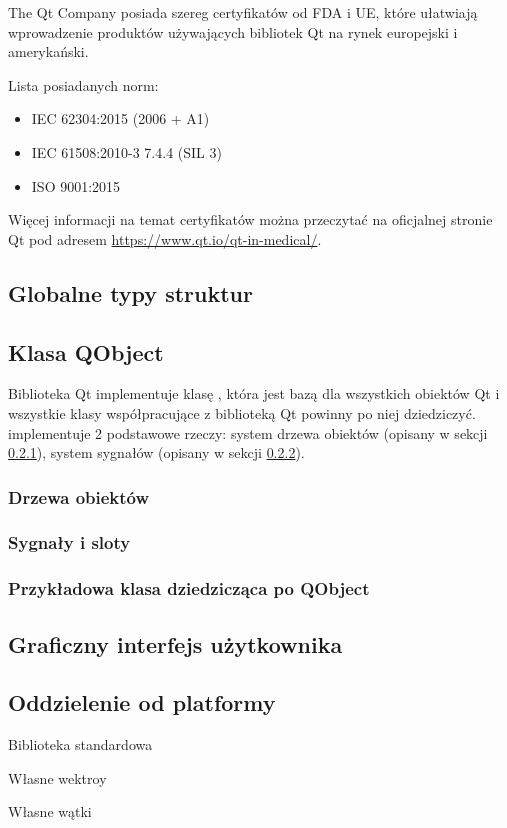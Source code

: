 \par
The Qt Company posiada szereg certyfikatów od FDA i UE, które ułatwiają wprowadzenie produktów używających bibliotek Qt na rynek europejski i amerykański.
\par
Lista posiadanych norm:
\begin{itemize}
    \item IEC 62304:2015 (2006 + A1)
    \item IEC 61508:2010-3 7.4.4 (SIL 3)
    \item ISO 9001:2015 
\end{itemize}
Więcej informacji na temat certyfikatów można przeczytać na oficjalnej stronie Qt pod adresem \url{https://www.qt.io/qt-in-medical/}.

\subsection{Globalne typy struktur}
\label{sec:qt-typedefs}


\subsection{Klasa QObject}

\qtclassExplanations

\par
Biblioteka Qt implementuje klasę , która jest bazą dla wszystkich obiektów Qt i wszystkie klasy współpracujące z biblioteką Qt powinny po niej dziedziczyć.
 implementuje 2 podstawowe rzeczy: system drzewa obiektów (opisany w sekcji \ref{sec:qt-pareting}), system sygnałów (opisany w sekcji \ref{sec:qt-signals}).

\subsubsection{Drzewa obiektów}
\label{sec:qt-pareting}


\subsubsection{Sygnały i sloty}
\label{sec:qt-signals}


\subsubsection{Przykładowa klasa dziedzicząca po QObject}


\subsection{Graficzny interfejs użytkownika}
\label{sec:qt-gui}


\subsection{Oddzielenie od platformy}

Biblioteka standardowa

Własne wektroy

Własne wątki
